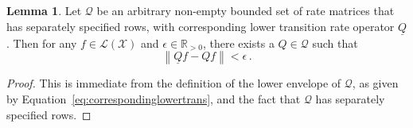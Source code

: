 \documentclass[10pt,a4paper]{paper}
\theoremstyle{definition}
\newtheorem{lemma}[theorem]{Lemma}
\newcommand{\reals}{\mathbb{R}}
\newcommand{\realspos}{\reals_{>0}}
\newcommand{\states}{\mathcal{X}}
\newcommand{\gambles}{\mathcal{L}}
\newcommand{\gamblesX}{\gambles(\states)}
\newcommand{\rateset}{\mathcal{Q}}
\newcommand{\lrate}{\underline{Q}}
\newcommand{\norm}[1]{\left\lVert #1 \right\rVert}
\begin{document}
\begin{lemma}\label{lemma:rateset_has_arginf}
Let $\rateset$ be an arbitrary non-empty bounded set of rate matrices that has separately specified rows, with corresponding lower transition rate operator $\lrate$. Then for any $f\in\gamblesX$ and $\epsilon\in\realspos$, there exists a $Q\in\rateset$ such that
\begin{equation*}
\norm{\lrate f - Qf} < \epsilon\,.
\end{equation*}
\end{lemma}
\begin{proof}
This is immediate from the definition of the lower envelope of $\rateset$, as given by Equation~\eqref{eq:correspondinglowertrans}, and the fact that $\rateset$ has separately specified rows.
\end{proof}
\end{document}
